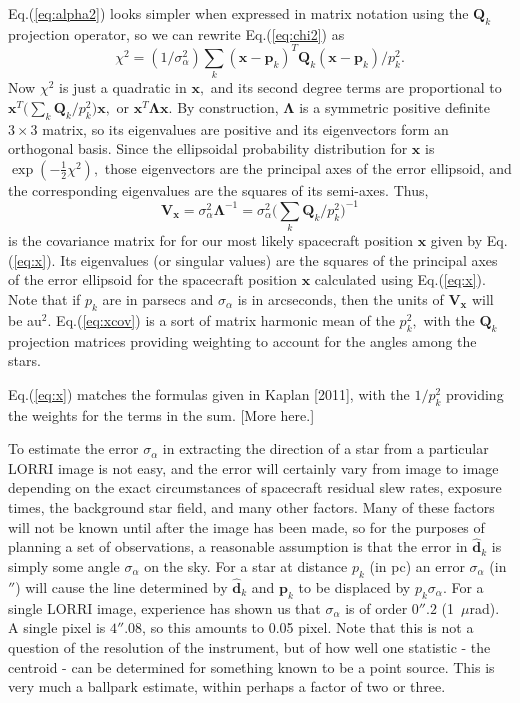 \documentclass[]{aastex63}
\newcommand{\BV}[1]{\mathbf{#1}}
\newcommand{\BH}[1]{\hat{\mathbf{#1}}}
\newcommand{\BL}{\boldsymbol{\Lambda}}
\begin{document}
Eq.(\ref{eq:alpha2}) looks simpler when expressed in matrix notation using the $\BV{Q}_k$ projection operator, so we can rewrite Eq.(\ref{eq:chi2}) as
\begin{equation} \chi^2 = (1/\sigma_\alpha^2)
  \sum_k(\BV{x}-\BV{p}_k)^T\BV{Q}_k(\BV{x}-\BV{p}_k)/p_k^2.
\label{eq:chi2a}\end{equation}
Now $\chi^2$ is just a quadratic in $\BV{x},$ and its second degree terms are proportional to $\BV{x}^T\bigl(\sum_k\BV{Q}_k/p_k^2\bigr)\BV{x},$ or $\BV{x}^T\BL \BV{x}.$ By construction, $\BL$ is a symmetric positive definite $3\times 3$ matrix, so its eigenvalues are positive and its eigenvectors form an orthogonal basis.  Since the ellipsoidal probability distribution for $\BV{x}$ is $\exp(-\tfrac{1}{2}\chi^2),$ those eigenvectors are the principal axes of the error ellipsoid, and the corresponding eigenvalues are the squares of its semi-axes.  Thus,
\begin{equation} \BV{V}_\BV{x} = \sigma_\alpha^2\BL^{-1} =
  \sigma_\alpha^2\bigl(\sum_k\BV{Q}_k/p_k^2\bigr)^{-1}
\label{eq:xcov}\end{equation}
is the covariance matrix for for our most likely spacecraft position $\BV{x}$ given by Eq.(\ref{eq:x}).  Its eigenvalues (or singular values) are the squares of the principal axes of the error ellipsoid for the spacecraft position $\BV{x}$ calculated using Eq.(\ref{eq:x}).  Note that if $p_k$ are in parsecs and $\sigma_\alpha$ is in arcseconds, then the units of $\BV{V}_\BV{x}$ will be au$^2.$ Eq.(\ref{eq:xcov}) is a sort of matrix harmonic mean of the $p_k^2,$ with the $\BV{Q}_k$ projection matrices providing weighting to account for the angles among the stars.

Eq.(\ref{eq:x}) matches the formulas given in Kaplan [2011], with the $1/p_k^2$ providing the weights for the terms in the sum.  [More here.]

To estimate the error $\sigma_\alpha$ in extracting the direction of a star from a particular LORRI image is not easy, and the error will certainly vary from image to image depending on the exact circumstances of spacecraft residual slew rates, exposure times, the background star field, and many other factors.  Many of these factors will not be known until after the image has been made, so for the purposes of planning a set of observations, a reasonable assumption is that the error in $\BH{d}_k$ is simply some angle $\sigma_\alpha$ on the sky.  For a star at distance $p_k$ (in pc) an error $\sigma_\alpha$ (in $''$) will cause the line determined by $\BH{d}_k$ and $\BV{p}_k$ to be displaced by $p_k\sigma_\alpha$.  For a single LORRI image, experience has shown us that $\sigma_\alpha$ is of order $0''\!\!.2$ (1~$\mu$rad).  A single pixel is $4''\!\!.08$, so this amounts to 0.05 pixel.  Note that this is not a question of the resolution of the instrument, but of how well one statistic - the centroid - can be determined for something known to be a point source. This is very much a ballpark estimate, within perhaps a factor of two or three.
\end{document}
